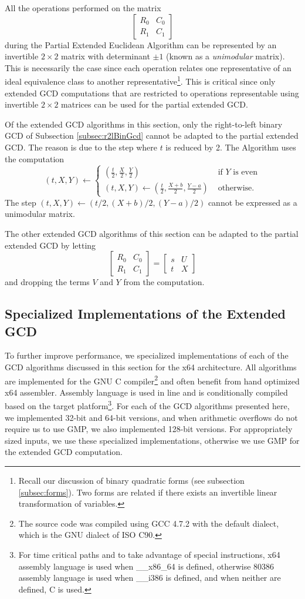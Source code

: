 \documentclass{ucalgthes1}
\theoremstyle{definition}
\newcommand{\matrixtt}[4]{\left[ \begin{array}{rr} #1 & #2 \\ #3 & #4 \end{array} \right]}
\begin{document}
All the operations performed on the matrix
\[
\matrixtt{R_0}{C_0}{R_1}{C_1}
\]
during the Partial Extended Euclidean Algorithm can be represented by an invertible $2 \times 2$ matrix with determinant $\pm 1$ (known as a \emph{unimodular} matrix).  This is necessarily the case since each operation relates one representative of an ideal equivalence class to another representative\footnote{Recall our discussion of binary quadratic forms (see subsection \ref{subsec:forms}). Two forms are related if there exists an invertible linear transformation of variables.}.  This is critical since only extended GCD computations that are restricted to operations representable using invertible $2 \times 2$ matrices can be used for the partial extended GCD.

Of the extended GCD algorithms in this section, only the right-to-left binary GCD of Subsection \ref{subsec:r2lBinGcd} cannot be adapted to the partial extended GCD.  The reason is due to the step where $t$ is reduced by 2.  The Algorithm uses the computation
\[
	(t, X, Y) \gets \begin{cases}
		\left( \frac{t}{2}, \frac{X}{2}, \frac{Y}{2} \right) &
			\textrm{ if $Y$ is even} \\
		(t, X, Y) \gets \left( \frac{t}{2}, \frac{X+b}{2}, \frac{Y-a}{2} \right) & 
			\textrm{ otherwise.}
	\end{cases}
\]
The step $(t, X, Y) \gets (t/2, (X+b)/2, (Y-a)/2)$ cannot be expressed as a unimodular matrix.

The other extended GCD algorithms of this section can be adapted to the partial extended GCD by letting
\[
	\matrixtt{R_0}{C_0}{R_1}{C_1} = \matrixtt{s}{U}{t}{X}
\]
and dropping the terms $V$ and $Y$ from the computation.


\subsection{Specialized Implementations of the Extended GCD}
\label{subsec:gcdImpl}

To further improve performance, we specialized implementations of each of the GCD algorithms discussed in this section for the x64 architecture.  All algorithms are implemented for the GNU C compiler\footnote{The source code was compiled using GCC 4.7.2 with the default dialect, which is the GNU dialect of ISO C90.} and often benefit from hand optimized x64 assembler.  Assembly language is used in line and is conditionally compiled based on the target platform\footnote{For time critical paths and to take advantage of special instructions, x64 assembly language is used when \textrm{\_\_x86\_64} is defined, otherwise 80386 assembly language is used when \textrm{\_\_i386} is defined, and when neither are defined, C is used.}.  For each of the GCD algorithms presented here, we implemented 32-bit and 64-bit versions, and when arithmetic overflows do not require us to use GMP, we also implemented 128-bit versions.  For appropriately sized inputs, we use these specialized implementations, otherwise we use GMP for the extended GCD computation.
\end{document}

